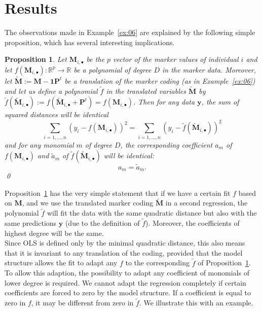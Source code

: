 \documentclass{bmcart}
\newtheorem{proposition}{Proposition}
\newcommand{\M}{\mathbf{M}}
\newcommand{\0}{\mathbf{0}}
\newcommand{\y}{\mathbf{y}}
\renewcommand{\P}{\mathbf{P}}
\begin{document}
\section*{Results} 
The observations made in Example~\ref{ex:06} are explained by the  following simple proposition,
which has several interesting implications.
\begin{proposition}\label{prop:01} Let $\M_{i,\bullet}$ be the $p$ vector of the marker values of individual $i$ and let $f(\M_{i,\bullet}): \mathbb{R}^p \rightarrow \mathbb{R}$ be a polynomial of degree $D$ in the marker data. Moreover, let $\tilde{\M}:= \M - \mathbf{1} \P^t$ be a translation of the marker coding (as in Example~\ref{ex:06}) and let us define a polynomial $\tilde{f}$ in the translated variables $\tilde{\M}$ by $\tilde{f}(\tilde{\M}_{i,\bullet}):= f(\tilde{\M}_{i,\bullet} +  \P^t)=f(\M_{i,\bullet})$. Then for any data $\y$, the sum of squared distances will be identical 
	$$ \sum_{i=1,...,n} (y_i - f(\M_{i,\bullet}))^2 = \sum_{i=1,...,n} (y_i - \tilde{f}(\tilde{\M}_{i,\bullet}))^2 $$
	and for any monomial $m$ of degree $D$, the corresponding coefficient $a_m$ of $f(\M_{i,\bullet})$ and $\tilde{a}_m$ of $\tilde{f}(\tilde{\M}_{i,\bullet})$ will be identical:
	$$a_m = \tilde{a}_m.$$ \qed
\end{proposition}
Proposition~\ref{prop:01} has the very simple statement that if we have a certain fit $f$ based on $\M$, and we use the translated marker coding $\tilde{\M}$ in a second regression, the polynomial $\tilde{f}$ will fit the data with the same quadratic distance but also with the same predictions $\hat{\y}$ (due to the definition of $\tilde{f}$). Moreover, the coefficients of highest degree will be the same.  \\

Since OLS is defined only by the minimal quadratic distance, this also means that it is invariant to any translation of the coding, provided that the model structure allows the fit to 
adapt any $f$ to the corresponding $\tilde{f}$ of Proposition~\ref{prop:01}.
To allow this adaption, the possibility to adapt any coefficient of monomials of lower degree is required.
We cannot adapt the regression completely if certain coefficients are forced to zero by the model structure. If a coefficient is equal to zero in $f$, it may be different from zero in $\tilde{f}$.
We illustrate this with an example. 
\end{document}
